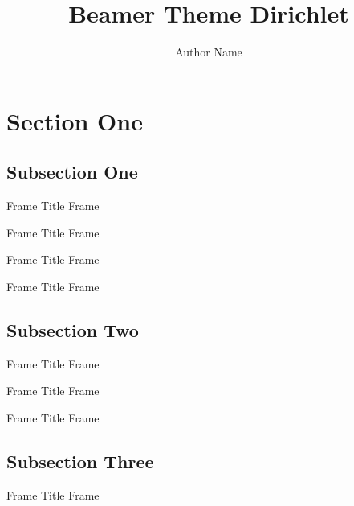 \documentclass[12pt,xcolor={rgb}]{beamer}
\begin{document}
\title{Beamer Theme Dirichlet}
\author{Author Name}

\begin{frame}[plain]
\titlepage
\end{frame}

\section{Section One}

\subsection{Subsection One}

\begin{frame}{Frame Title}
Frame \insertframenumber
\end{frame}

\begin{frame}{Frame Title}
Frame \insertframenumber
\end{frame}

\begin{frame}{Frame Title}
Frame \insertframenumber
\end{frame}

\begin{frame}{Frame Title}
Frame \insertframenumber
\end{frame}

\subsection{Subsection Two}

\begin{frame}{Frame Title}
Frame \insertframenumber
\end{frame}

\begin{frame}{Frame Title}
Frame \insertframenumber
\end{frame}

\begin{frame}{Frame Title}
Frame \insertframenumber
\end{frame}

\subsection{Subsection Three}

\begin{frame}{Frame Title}
Frame \insertframenumber
\end{frame}
\end{document}
